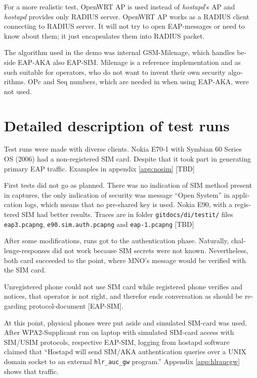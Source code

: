 \documentclass[12pt,a4paper,english]{tutthesis}
\begin{document}
\begin{otherlanguage}{english}
For a more realistic test, OpenWRT AP is used instead of \emph{hostapd}'s
AP and \emph{hostapd} provides only RADIUS server.
OpenWRT AP works as a RADIUS client connecting to RADIUS server. 
It will not try to open EAP-messages or need
to know about them; it just encapsulates them into RADIUS packet.

The algorithm used in the demo was internal GSM-Milenage,
which handles beside EAP-AKA also EAP-SIM.
Milenage is a reference implementation and as such suitable for operators, who do not 
want to invent their own security algorithms. OPc and Seq numbers,
which are needed in when using EAP-AKA, were not used.

\section{Detailed description of test runs}
\label{sec-5-2}






Test runs were made with diverse clients.
Nokia E70-1 with Symbian 60 Series OS (2006) had a
non-registered SIM card. Despite that it took part in generating
primary EAP traffic.
Examples in appendix \ref{app:nosim}   [TBD]

First tests 
did not go as planned. There was no indication of SIM method
present in captures, the only indication of security was message
``Open System'' in application logs, which means that no pre-shared
key is used.
Nokia E90, with a registered SIM had better results. Traces
are in folder \verb~gitdocs/di/testit/~ files \verb~eap3.pcapng~,
  \verb~e90.sim.auth.pcapng~ and \verb~eap-1.pcapng~  [TBD]

After some modifications, runs got to the authentication phase.
Naturally, challenge-responses did not work because SIM secrets were
not known. Nevertheless, both card succeeded to the point, where MNO's
message would be verified with the SIM card.

Unregistered phone could not use SIM card while 
registered phone verifies and notices, that operator is not right, 
and therefor ends conversation as should be regarding protocol-document [EAP-SIM].

At this point, physical phones were put aside and simulated SIM-card
was used.
After WPA2-Supplicant run on laptop with simulated SIM-card access 
with SIM/USIM protocols, respective EAP-SIM, logging 
from hostapd software claimed that ``Hostapd will send SIM/AKA authentication
queries over a UNIX domain socket to an external \verb~hlr_auc_gw~ program.''
Appendix \ref{app:hlraucgw}   shows that traffic.


\end{otherlanguage}
\end{document}
